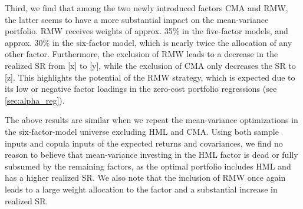 Third, we find that among the two newly introduced factors CMA and RMW, the latter seems to have a more substantial impact on the mean-variance portfolio. RMW receives weights of approx. 35\% in the five-factor models, and approx. 30\% in the six-factor model, which is nearly twice the allocation of any other factor. Furthermore, the exclusion of RMW leads to a decrease in the realized SR from [x] to [y], while the exclusion of CMA only decreases the SR to [z]. This highlights the potential of the RMW strategy, which is expected due to its low or negative factor loadings in the zero-cost portfolio regressions (see \autoref{sec:alpha_reg}).

The above results are similar when we repeat the mean-variance optimizations in the six-factor-model universe excluding HML and CMA. Using both sample inputs and copula inputs of the expected returns and covariances, we find no reason to believe that mean-variance investing in the HML factor is dead or fully subsumed by the remaining factors, as the optimal portfolio includes HML and has a higher realized SR. We also note that the inclusion of RMW once again leads to a large weight allocation to the factor and a substantial increase in realized SR.

